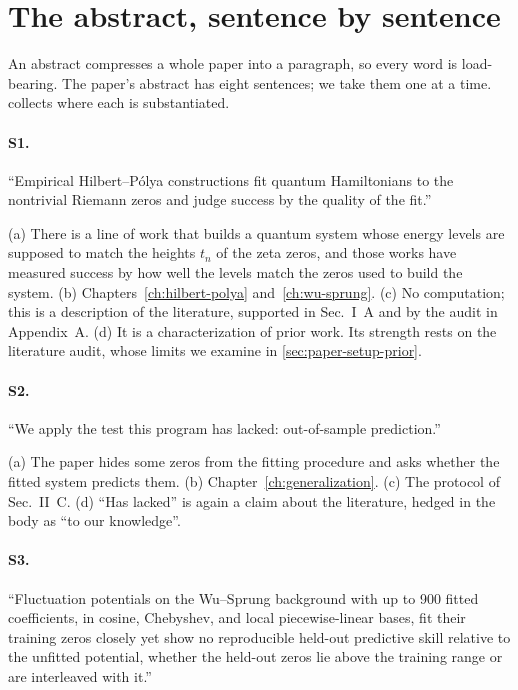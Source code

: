 \section{The abstract, sentence by sentence}\label{sec:paper-setup-abstract}

An abstract compresses a whole paper into a paragraph, so every word is load-bearing. The paper's abstract has eight sentences; we take them one at a time.  collects where each is substantiated.

\paragraph{S1.} ``Empirical Hilbert--P\'olya constructions fit quantum Hamiltonians to the nontrivial Riemann zeros and judge success by the quality of the fit.''

(a) There is a line of work that builds a quantum system whose energy levels are supposed to match the heights $t_n$ of the zeta zeros, and those works have measured success by how well the levels match the zeros used to build the system. (b) Chapters~\ref{ch:hilbert-polya} and~\ref{ch:wu-sprung}. (c) No computation; this is a description of the literature, supported in Sec.~I~A and by the audit in Appendix~A. (d) It is a characterization of prior work. Its strength rests on the literature audit, whose limits we examine in \cref{sec:paper-setup-prior}.

\paragraph{S2.} ``We apply the test this program has lacked: out-of-sample prediction.''

(a) The paper hides some zeros from the fitting procedure and asks whether the fitted system predicts them. (b) Chapter~\ref{ch:generalization}. (c) The protocol of Sec.~II~C. (d) ``Has lacked'' is again a claim about the literature, hedged in the body as ``to our knowledge''.

\paragraph{S3.} ``Fluctuation potentials on the Wu--Sprung background with up to 900 fitted coefficients, in cosine, Chebyshev, and local piecewise-linear bases, fit their training zeros closely yet show no reproducible held-out predictive skill relative to the unfitted potential, whether the held-out zeros lie above the training range or are interleaved with it.''

